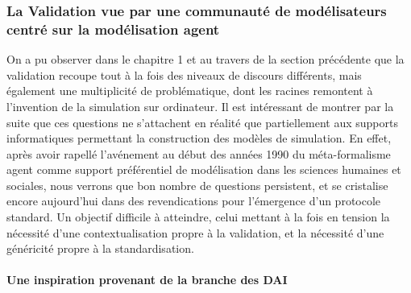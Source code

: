 
\subsubsection{La Validation vue par une communauté de modélisateurs centré sur la modélisation agent}
\label{sssec:communautes_jasss}

On a pu observer dans le chapitre 1 et au travers de la section précédente que la validation recoupe tout à la fois des niveaux de discours différents, mais également une multiplicité de problématique, dont les racines remontent à l'invention de la simulation sur ordinateur. Il est intéressant de montrer par la suite que ces questions ne s'attachent en réalité que partiellement aux supports informatiques permettant la construction des modèles de simulation. En effet, après avoir rapellé  l'avénement au début des années 1990 du méta-formalisme agent comme support préférentiel de modélisation dans les sciences humaines et sociales, nous verrons que bon nombre de questions persistent, et se cristalise encore aujourd'hui dans des revendications pour l'émergence d'un protocole standard. Un objectif difficile à atteindre, celui mettant à la fois en tension la nécessité d'une contextualisation propre à la validation, et la nécessité d'une généricité propre à la standardisation.


\paragraph{Une inspiration provenant de la branche des DAI}

